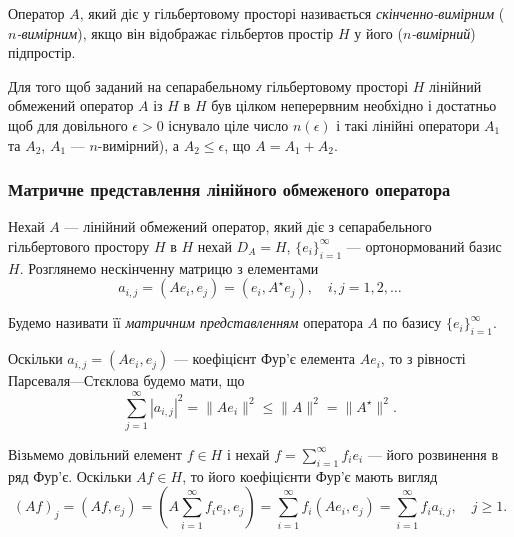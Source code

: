 \begin{definition}
    Оператор $A$, який діє у гільбертовому просторі називається \emph{скінченно-вимірним} (\emph{$n$-вимірним}), якщо він відображає гільбертов простір $H$ у його (\emph{$n$-вимірний}) підпростір.
\end{definition}

\begin{theorem}
    Для того щоб заданий на сепарабельному гільбертовому просторі $H$ лінійний обмежений оператор $A$ із $H$ в $H$ був цілком неперервним необхідно і достатньо щоб для довільного $\epsilon > 0$ існувало ціле число $n(\epsilon)$ і такі лінійні оператори $A_1$ та $A_2$, $A_1$ --- $n$-вимірний), а $A_2 \le \epsilon$, що $A = A_1 + A_2$. 
\end{theorem}

\subsubsection{Матричне представлення лінійного обмеженого оператора}

Нехай $A$ --- лінійний обмежений оператор, який діє з сепарабельного гільбертового простору $H$ в $H$ нехай $D_A = H$, $\{e_i\}_{i = 1}^\infty$ --- ортонормований базис $H$. Розглянемо нескінченну матрицю з елементами
\begin{equation}
    \label{eq:5.1.1}
    a_{i,j} = (A e_i, e_j) = (e_i, A^\star e_j), \quad i, j = 1, 2, \ldots
\end{equation}

\begin{definition}
    Будемо називати її \emph{матричним представленням} оператора $A$ по базису $\{e_i\}_{i = 1}^\infty$.
\end{definition}

Оскільки $a_{i,j} = (A e_i, e_j)$ --- коефіцієнт Фур'є елемента $A e_i$, то з рівності Парсеваля---Стєклова будемо мати, що
\begin{equation}
    \label{eq:5.1.2}
    \sum_{j = 1}^\infty |a_{i, j}|^2 = \|A e_i\|^2 \le \|A\|^2 = \|A^\star\|^2.
\end{equation}

Візьмемо довільний елемент $f \in H$ і нехай $f = \sum_{i = 1}^\infty f_i e_i$ --- його розвинення в ряд Фур'є. Оскільки $A f \in H$, то його коефіцієнти Фур'є мають вигляд
\begin{equation}
    \label{eq:5.1.3}
    (A f)_j = (Af, e_j) = \left( A \sum_{i = 1}^\infty f_i e_i, e_j \right) = \sum_{i = 1}^\infty f_i (A e_i, e_j) = \sum_{i = 1}^\infty f_i a_{i,j}, \quad j \ge 1.
\end{equation}

